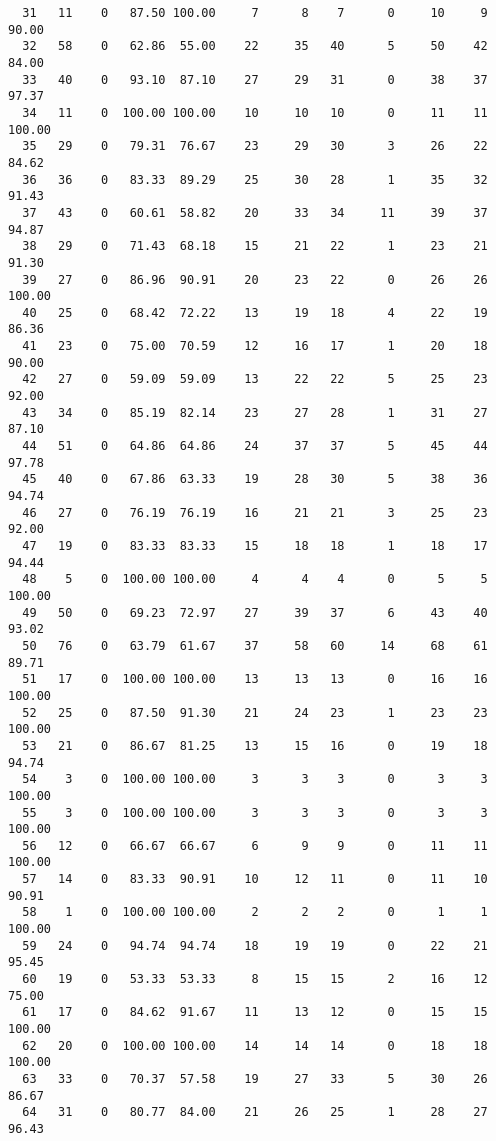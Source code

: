 \begin{verbatim}
  31   11    0   87.50 100.00     7      8    7      0     10     9    90.00
  32   58    0   62.86  55.00    22     35   40      5     50    42    84.00
  33   40    0   93.10  87.10    27     29   31      0     38    37    97.37
  34   11    0  100.00 100.00    10     10   10      0     11    11   100.00
  35   29    0   79.31  76.67    23     29   30      3     26    22    84.62
  36   36    0   83.33  89.29    25     30   28      1     35    32    91.43
  37   43    0   60.61  58.82    20     33   34     11     39    37    94.87
  38   29    0   71.43  68.18    15     21   22      1     23    21    91.30
  39   27    0   86.96  90.91    20     23   22      0     26    26   100.00
  40   25    0   68.42  72.22    13     19   18      4     22    19    86.36
  41   23    0   75.00  70.59    12     16   17      1     20    18    90.00
  42   27    0   59.09  59.09    13     22   22      5     25    23    92.00
  43   34    0   85.19  82.14    23     27   28      1     31    27    87.10
  44   51    0   64.86  64.86    24     37   37      5     45    44    97.78
  45   40    0   67.86  63.33    19     28   30      5     38    36    94.74
  46   27    0   76.19  76.19    16     21   21      3     25    23    92.00
  47   19    0   83.33  83.33    15     18   18      1     18    17    94.44
  48    5    0  100.00 100.00     4      4    4      0      5     5   100.00
  49   50    0   69.23  72.97    27     39   37      6     43    40    93.02
  50   76    0   63.79  61.67    37     58   60     14     68    61    89.71
  51   17    0  100.00 100.00    13     13   13      0     16    16   100.00
  52   25    0   87.50  91.30    21     24   23      1     23    23   100.00
  53   21    0   86.67  81.25    13     15   16      0     19    18    94.74
  54    3    0  100.00 100.00     3      3    3      0      3     3   100.00
  55    3    0  100.00 100.00     3      3    3      0      3     3   100.00
  56   12    0   66.67  66.67     6      9    9      0     11    11   100.00
  57   14    0   83.33  90.91    10     12   11      0     11    10    90.91
  58    1    0  100.00 100.00     2      2    2      0      1     1   100.00
  59   24    0   94.74  94.74    18     19   19      0     22    21    95.45
  60   19    0   53.33  53.33     8     15   15      2     16    12    75.00
  61   17    0   84.62  91.67    11     13   12      0     15    15   100.00
  62   20    0  100.00 100.00    14     14   14      0     18    18   100.00
  63   33    0   70.37  57.58    19     27   33      5     30    26    86.67
  64   31    0   80.77  84.00    21     26   25      1     28    27    96.43

\end{verbatim}
